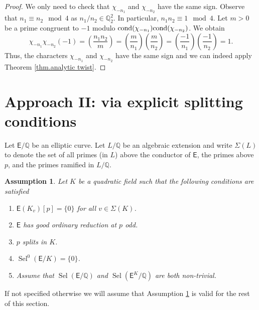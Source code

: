 \documentclass{amsart}
\newtheorem{assumption}[theorem]{Assumption}
\numberwithin{equation}{section}
\theoremstyle{remark}
\newcommand{\Sel}{\operatorname{Sel}}
\newcommand{\Q}{\mathbb{Q}}
\newcommand{\EC}{\mathsf{E}}
\theoremstyle{plain} %
\begin{document}
\begin{proof}
We only need to check that $\chi_{-n_1}$ and $\chi_{-n_2}$ have the same sign.
Observe that $n_1\equiv n_2\mod 4$ as $n_1/n_2\in \Q_2^2$.
In particular, $n_1 n_2\equiv 1\mod 4$.
Let $m>0$ be a prime congruent to $-1$ modulo $\textup{cond}(\chi_{-n_1})\textup{cond}(\chi_{-n_2})$.
We obtain
\[
\chi_{-n_1}\chi_{-n_2}(-1)=\left(\frac{n_1n_2}{m}\right)=\left(\frac{m}{n_1}\right)\left(\frac{m}{n_2}\right)=\left(\frac{-1}{n_1}\right)\left(\frac{-1}{n_2}\right)=1.
\]
Thus, the characters $\chi_{-n_1}$ and $\chi_{-n_2}$ have the same sign and we can indeed apply Theorem \ref{thm.analytic twist}.
\end{proof}



\section{Approach II: via explicit splitting conditions}
\label{sec: approach 2}
Let $\EC/\Q$ be an elliptic curve.
Let $L/\Q$ be an algebraic extension and write $\Sigma(L)$ to denote the set of all primes (in $L$) above the conductor of $\EC$, the primes above $p$, and the primes ramified in $L/\Q$.


\begin{assumption}\label{ass}Let $K$ be a quadratic field such that the following conditions are satisfied
    \begin{enumerate}
    \item[\textup{(}i\textup{)}] $\EC(K_v)[p]=\{0\}$ for all $v\in \Sigma(K)$.
    \item[\textup{(}ii\textup{)}] $\EC$ has good ordinary reduction at $p$ odd.
    \item[\textup{(}iii\textup{)}] $p$ splits in $K$.
    \item [\textup{(}iv\textup{)}] $\Sel^0(\EC/K)= \{0\}$.
    \item[\textup{(}v\textup{)}]
    Assume that $\Sel(\EC/\Q)$ and $\Sel(\EC^K/\Q)$ are both non-trivial.
\end{enumerate}
\end{assumption}
If not specified otherwise we will assume that Assumption \ref{ass} is valid for the rest of this section.
\end{document}

